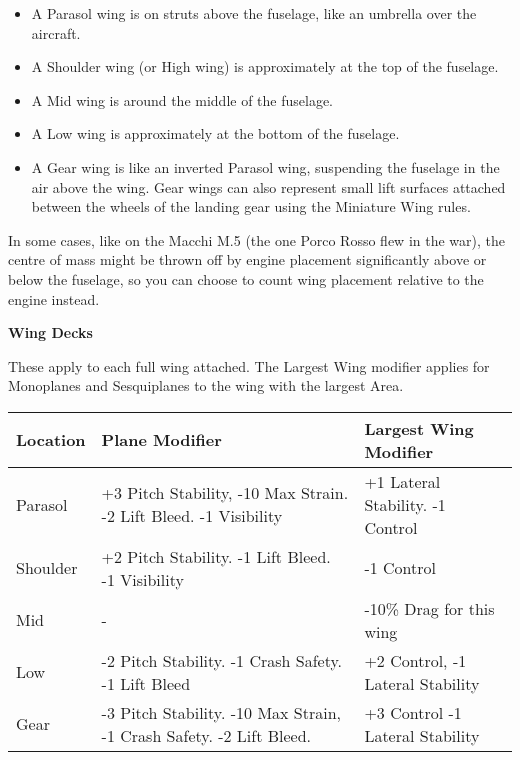 \documentclass{article}
\begin{document}
\begin{itemize}
    \item          A Parasol wing is on struts above the fuselage, like an
          umbrella over the aircraft.
    \item          A Shoulder wing (or High wing) is approximately at the top of the
          fuselage.
    \item          A Mid wing is around the middle of the fuselage.
    \item          A Low wing is approximately at the bottom of the fuselage.
    \item          A Gear wing is like an inverted Parasol wing, suspending the
          fuselage in the air above the wing. Gear wings can also represent
          small lift surfaces attached between the wheels of the landing gear
          using the Miniature Wing rules.
\end{itemize}

In some cases, like on the Macchi M.5 (the one Porco Rosso flew in the
war), the centre of mass might be thrown off by engine placement
significantly above or below the fuselage, so you can choose to count
wing placement relative to the engine instead.

\textbf{Wing Decks}

These apply to each full wing attached. The Largest Wing modifier
applies for Monoplanes and Sesquiplanes to the wing with the largest
Area.

\begin{tabular}{|l|l|l|}
    \hline
    Location   & Plane Modifier                                               & Largest Wing Modifier    \\\hline
    Parasol    & +3 Pitch Stability, -10 Max Strain. -2 Lift Bleed. -1
    Visibility & +1 Lateral Stability. -1 Control                                                        \\\hline
    Shoulder   & +2 Pitch Stability. -1 Lift Bleed. -1 Visibility             & -1
    Control                                                                                              \\\hline
    Mid        & -                                                            & -10\% Drag for this wing \\\hline
    Low        & -2 Pitch Stability. -1 Crash Safety. -1 Lift Bleed           & +2 Control,
    -1 Lateral Stability                                                                                 \\\hline
    Gear       & -3 Pitch Stability. -10 Max Strain, -1 Crash Safety. -2 Lift
    Bleed.     & +3 Control -1 Lateral Stability                                                         \\\hline
\end{tabular}
\end{document}
